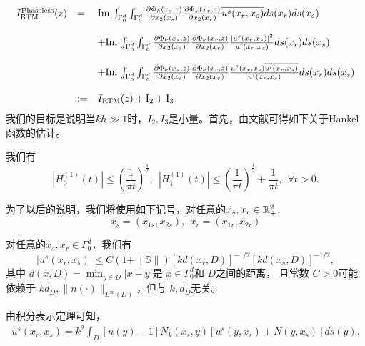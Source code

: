 \begin{eqnarray*}\label{I123}
\begin{array}{lll}
 I^{\rm Phaseless}_{\rm RTM}(z)&=& \Im\int_{\Gamma_{0}^d}\int_{\Gamma_0^d}\frac{\partial\Phi_k(x_s,z)}{\partial x_2(x_s)}\frac{\partial\Phi_k(x_r,z)}{\partial x_2(x_r)}
  \overline{u^s(x_r,x_s)}  ds(x_r)ds(x_s)\\
  & &\\
  & &+ \Im\int_{\Gamma_{0}^d}\int_{\Gamma_0^d}\frac{\partial\Phi_k(x_s,z)}{\partial x_2(x_s)}\frac{\partial\Phi_k(x_r,z)}{\partial x_2(x_r)}\frac{|u^s(x_r,x_s)|^2}{u^i(x_r,x_s)}ds(x_r)ds(x_s)\\
  & &\\
  & & +\Im\int_{\Gamma_{0}^d}\int_{\Gamma_0^d}\frac{\partial\Phi_k(x_s,z)}{\partial x_2(x_s)}\frac{\partial\Phi_k(x_r,z)}{\partial x_2(x_r)}
  \frac{u^s(x_r,x_s)
  \overline{u^i(x_r,x_s)}}{u^i(x_r,x_s)}ds(x_r)ds(x_s)\\
  & &\\
  &:=& I_{\rm RTM}(z)+{\rm I}_2+{\rm I}_3
\end{array}
\end{eqnarray*}
我们的目标是说明当$kh\gg1$时，$I_2,I_3$是小量。首先，由文献\cite[(1.22)-(1.23)]{cg09}可得如下关于Hankel函数的估计。
\begin{lemma}\label{lem:4.0}
我们有
\begin{equation*}
  |H_0^{(1)}(t)|\leq\left(\frac{1}{\pi t}\right)^{\frac{1}{2}},\  \
  |H_1^{(1)}(t)|\leq\left(\frac{1}{\pi t}\right)^{\frac{1}{2}}+\frac{1}{\pi t},\  \ \forall t>0.
\end{equation*}
\end{lemma}
为了以后的说明，我们将使用如下记号，对任意的$x_s,x_r\in\R^2_+$,
\begin{equation*}
  x_s=(x_{1s},x_{2s}),\ \ x_r=(x_{1r},x_{2r})
\end{equation*}
\begin{lemma}\label{lem:4.1}
对任意的$x_s, x_r\in\Gamma_0^d$，我们有
\begin{equation*}
  |u^s(x_r,x_s)|\leq C(1 + \|\mathbb{S}\|)[kd(x_r,D)]^{-1/2}[kd(x_s,D)]^{-1/2},
\end{equation*}
其中 $d(x,D)=\min_{y\in \overline D}|x-y|$是 $x\in\Gamma^d_0$和 $D$之间的距离， 且常数 $C>0$可能依赖于 $kd_D, \|n(\cdot)\|_{L^{\infty}(D)}$，但与 $k, d_D$无关。
\end{lemma}
\debproof
由积分表示定理可知，
\begin{eqnarray*}
  u^s(x_r,x_s)=k^2\int_{D}[n(y)-1]N_k(x_r,y)[u^s(y,x_s)+N(y,x_s)]ds(y).
\end{eqnarray*}
